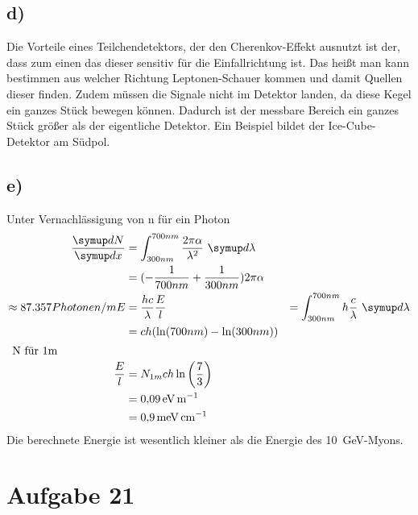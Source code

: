 \subsection{d)}
Die Vorteile eines Teilchendetektors, der den Cherenkov-Effekt ausnutzt ist der, dass
zum einen das dieser sensitiv für die Einfallrichtung ist. Das heißt man kann
bestimmen aus welcher Richtung Leptonen-Schauer kommen und damit Quellen dieser finden.
Zudem müssen die Signale nicht im Detektor landen, da diese Kegel ein ganzes Stück bewegen können. 
Dadurch ist der messbare Bereich ein ganzes Stück größer als der eigentliche Detektor.
Ein Beispiel bildet der Ice-Cube-Detektor am Südpol.

\subsection{e)}
Unter Vernachlässigung von n für ein Photon
\begin{align}
    \frac{\dif{N}}{\dif{x}} &= \int_{300nm}^{700nm} \frac{2 \pi \alpha}{\lambda^2} \,\dif{\lambda}\\
    &= (-\frac{1}{700nm}+\frac{1}{300nm}) 2 \pi \alpha \\
    \approx 87.357 Photonen/m
    E&=\frac{hc}{\lambda}
    \frac{E}{l} &= \int_{300nm}^{700nm} h \frac{c}{\lambda} \,\dif{\lambda}\\
    &= ch(\ln (700nm)-\ln(300nm) )\\
    \intertext{
        N für 1m
    }
    \frac{E}{l} &= N_{1m} ch \ln \left(\frac{7}{3} \right)\\
    &= \SI{0.09}{\electronvolt\per\meter}\\
    &= \SI{0.9}{\milli\electronvolt\per\centi\meter}
\end{align}
Die berechnete Energie ist wesentlich kleiner als die Energie des \SI{10}{\giga\electronvolt}-Myons.


\section{Aufgabe 21}

